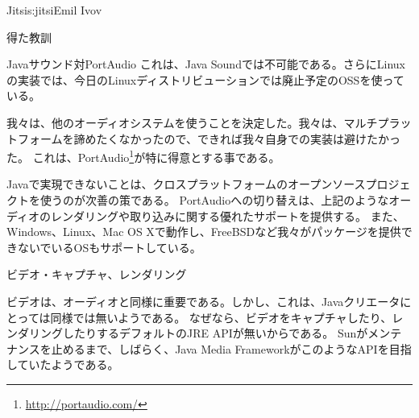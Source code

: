 \begin{aosachapter}{Jitsi}{s:jitsi}{Emil Ivov}
\begin{aosasect1}{得た教訓}
\begin{aosasect2}{Javaサウンド対PortAudio}
これは、Java Soundでは不可能である。さらにLinuxの実装では、今日のLinuxディストリビューションでは廃止予定のOSSを使っている。

我々は、他のオーディオシステムを使うことを決定した。我々は、マルチプラットフォームを諦めたくなかったので、できれば我々自身での実装は避けたかった。
これは、PortAudio\footnote{\url{http://portaudio.com/}}が特に得意とする事である。

Javaで実現できないことは、クロスプラットフォームのオープンソースプロジェクトを使うのが次善の策である。
PortAudioへの切り替えは、上記のようなオーディオのレンダリングや取り込みに関する優れたサポートを提供する。
また、Windows、Linux、Mac OS Xで動作し、FreeBSDなど我々がパッケージを提供できないでいるOSもサポートしている。

\end{aosasect2}

\begin{aosasect2}{ビデオ・キャプチャ、レンダリング}

ビデオは、オーディオと同様に重要である。しかし、これは、Javaクリエータにとっては同様では無いようである。
なぜなら、ビデオをキャプチャしたり、レンダリングしたりするデフォルトのJRE APIが無いからである。
Sunがメンテナンスを止めるまで、しばらく、Java Media FrameworkがこのようなAPIを目指していたようである。


\end{aosasect2}
\end{aosasect1}
\end{aosachapter}
